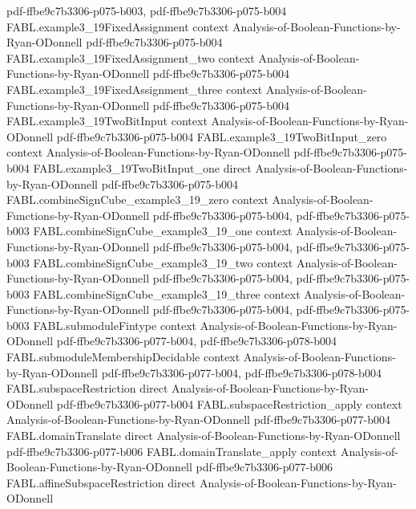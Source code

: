 \begin{theorem}
  {pdf-ffbe9c7b3306-p075-b003,
    pdf-ffbe9c7b3306-p075-b004}
\proofstep
  {FABL.example3_19FixedAssignment}
  {context}
  {Analysis-of-Boolean-Functions-by-Ryan-ODonnell}
  {pdf-ffbe9c7b3306-p075-b004}
\proofstep
  {FABL.example3_19FixedAssignment_two}
  {context}
  {Analysis-of-Boolean-Functions-by-Ryan-ODonnell}
  {pdf-ffbe9c7b3306-p075-b004}
\proofstep
  {FABL.example3_19FixedAssignment_three}
  {context}
  {Analysis-of-Boolean-Functions-by-Ryan-ODonnell}
  {pdf-ffbe9c7b3306-p075-b004}
\proofstep
  {FABL.example3_19TwoBitInput}
  {context}
  {Analysis-of-Boolean-Functions-by-Ryan-ODonnell}
  {pdf-ffbe9c7b3306-p075-b004}
\proofstep
  {FABL.example3_19TwoBitInput_zero}
  {context}
  {Analysis-of-Boolean-Functions-by-Ryan-ODonnell}
  {pdf-ffbe9c7b3306-p075-b004}
\proofstep
  {FABL.example3_19TwoBitInput_one}
  {direct}
  {Analysis-of-Boolean-Functions-by-Ryan-ODonnell}
  {pdf-ffbe9c7b3306-p075-b004}
\proofstep
  {FABL.combineSignCube_example3_19_zero}
  {context}
  {Analysis-of-Boolean-Functions-by-Ryan-ODonnell}
  {pdf-ffbe9c7b3306-p075-b004,
    pdf-ffbe9c7b3306-p075-b003}
\proofstep
  {FABL.combineSignCube_example3_19_one}
  {context}
  {Analysis-of-Boolean-Functions-by-Ryan-ODonnell}
  {pdf-ffbe9c7b3306-p075-b004,
    pdf-ffbe9c7b3306-p075-b003}
\proofstep
  {FABL.combineSignCube_example3_19_two}
  {context}
  {Analysis-of-Boolean-Functions-by-Ryan-ODonnell}
  {pdf-ffbe9c7b3306-p075-b004,
    pdf-ffbe9c7b3306-p075-b003}
\proofstep
  {FABL.combineSignCube_example3_19_three}
  {context}
  {Analysis-of-Boolean-Functions-by-Ryan-ODonnell}
  {pdf-ffbe9c7b3306-p075-b004,
    pdf-ffbe9c7b3306-p075-b003}
\proofstep
  {FABL.submoduleFintype}
  {context}
  {Analysis-of-Boolean-Functions-by-Ryan-ODonnell}
  {pdf-ffbe9c7b3306-p077-b004,
    pdf-ffbe9c7b3306-p078-b004}
\proofstep
  {FABL.submoduleMembershipDecidable}
  {context}
  {Analysis-of-Boolean-Functions-by-Ryan-ODonnell}
  {pdf-ffbe9c7b3306-p077-b004,
    pdf-ffbe9c7b3306-p078-b004}
\proofstep
  {FABL.subspaceRestriction}
  {direct}
  {Analysis-of-Boolean-Functions-by-Ryan-ODonnell}
  {pdf-ffbe9c7b3306-p077-b004}
\proofstep
  {FABL.subspaceRestriction_apply}
  {context}
  {Analysis-of-Boolean-Functions-by-Ryan-ODonnell}
  {pdf-ffbe9c7b3306-p077-b004}
\proofstep
  {FABL.domainTranslate}
  {direct}
  {Analysis-of-Boolean-Functions-by-Ryan-ODonnell}
  {pdf-ffbe9c7b3306-p077-b006}
\proofstep
  {FABL.domainTranslate_apply}
  {context}
  {Analysis-of-Boolean-Functions-by-Ryan-ODonnell}
  {pdf-ffbe9c7b3306-p077-b006}
\proofstep
  {FABL.affineSubspaceRestriction}
  {direct}
  {Analysis-of-Boolean-Functions-by-Ryan-ODonnell}

\end{theorem}
